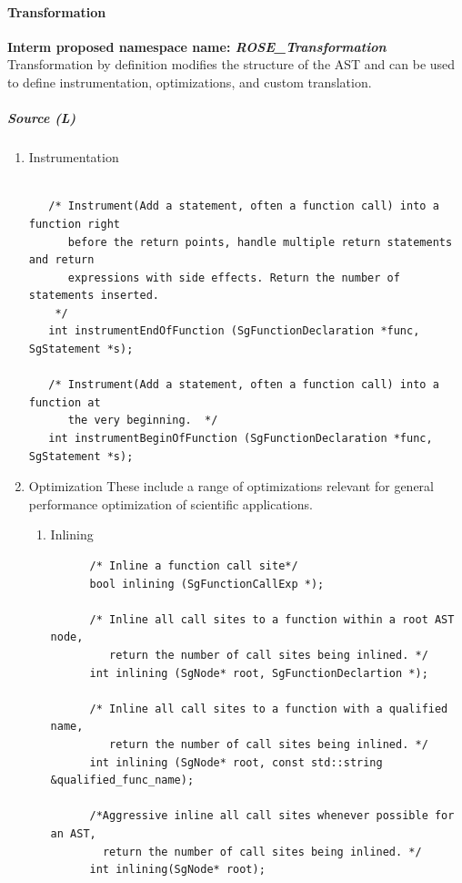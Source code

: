 \paragraph{Transformation}
{\bf Interm proposed namespace name: {\em ROSE\_Transformation}} \\
   Transformation by definition modifies the structure of the AST and can be used
to define instrumentation, optimizations, and custom translation.
\subparagraph{Source (L)}
\begin{enumerate}
   \item Instrumentation 
   \begin{lstlisting}

   /* Instrument(Add a statement, often a function call) into a function right
      before the return points, handle multiple return statements and return
      expressions with side effects. Return the number of statements inserted.
    */
   int instrumentEndOfFunction (SgFunctionDeclaration *func, SgStatement *s);

   /* Instrument(Add a statement, often a function call) into a function at
      the very beginning.  */
   int instrumentBeginOfFunction (SgFunctionDeclaration *func, SgStatement *s);
   \end{lstlisting}
   \item Optimization
         These include a range of optimizations relevant for general performance
         optimization of scientific applications.
   \begin{enumerate}
      \item Inlining
      \begin{lstlisting}
      /* Inline a function call site*/
      bool inlining (SgFunctionCallExp *);

      /* Inline all call sites to a function within a root AST node,
         return the number of call sites being inlined. */
      int inlining (SgNode* root, SgFunctionDeclartion *);

      /* Inline all call sites to a function with a qualified name,
         return the number of call sites being inlined. */
      int inlining (SgNode* root, const std::string &qualified_func_name);

      /*Aggressive inline all call sites whenever possible for an AST,
        return the number of call sites being inlined. */
      int inlining(SgNode* root);


\end{lstlisting}
\end{enumerate}
\end{enumerate}
